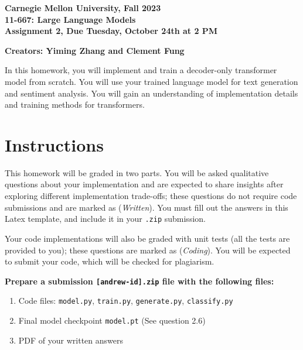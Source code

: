 \documentclass[leqno,12pt]{article}
\newcommand{\Term}{Fall 2023}
\newcommand{\Course}{11-667: Large Language Models}
\newcommand{\Assignment}{Assignment 2}
\newcommand{\DueDate}{Tuesday, October 24th at 2 PM}
\begin{document}
\begin{center}

\textbf{Carnegie Mellon University,  \Term} \\
\textbf{\Course} \\
\textbf{\Assignment, Due \DueDate}

\textbf{Creators: Yiming Zhang and Clement Fung}

\end{center}


In this homework, you will implement and train a decoder-only transformer model from scratch. You will use your trained language model for text generation and sentiment analysis. You will gain an understanding of implementation details and training methods for transformers. 

\section*{Instructions}

This homework will be graded in two parts. 
You will be asked qualitative questions about your implementation and are expected to share insights after exploring different implementation trade-offs; these questions do not require code submissions and are marked as (\emph{Written}). You must fill out the answers in this Latex template, and include it in your \texttt{.zip} submission. \newline

Your code implementations will also be graded with unit tests (all the tests are provided to you); these questions are marked as (\emph{Coding}). You will be expected to submit your code, which will be checked for plagiarism. \newline


\noindent \textbf{Prepare a submission \texttt{[andrew-id].zip} file with the following files:}
\begin{enumerate}
    \item Code files: \texttt{model.py}, \texttt{train.py}, \texttt{generate.py}, \texttt{classify.py}
    \item Final model checkpoint \texttt{model.pt} (See question 2.6)
    \item PDF of your written answers
\end{enumerate}
\end{document}
